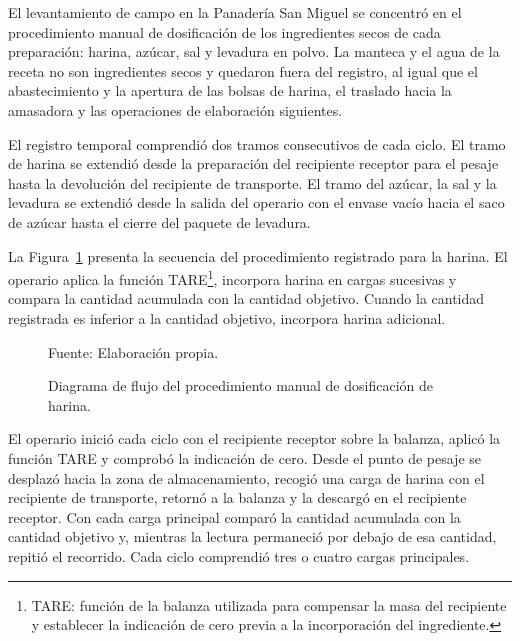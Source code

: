 El levantamiento de campo en la Panadería San Miguel se concentró en el
procedimiento manual de dosificación de los ingredientes secos de cada
preparación: harina, azúcar, sal y levadura en polvo. La manteca y el agua
de la receta no son ingredientes secos y quedaron fuera del registro, al
igual que el
abastecimiento y la apertura de las bolsas de harina, el traslado hacia la
amasadora y las operaciones de elaboración siguientes.

El registro temporal comprendió dos tramos consecutivos de cada ciclo. El
tramo de harina se extendió desde la preparación del recipiente receptor
para el pesaje hasta la devolución del recipiente de transporte. El tramo
del azúcar, la sal y la levadura se extendió desde la salida del operario
con el envase vacío hacia el saco de azúcar hasta el cierre del paquete de
levadura.

La Figura~\ref{fig:dfd_dosificacion} presenta la secuencia del
procedimiento registrado para la harina. El operario aplica la función
TARE\footnote{TARE: función de la balanza utilizada para compensar la masa
del recipiente y establecer la indicación de cero previa a la
incorporación del ingrediente.}, incorpora harina en cargas sucesivas y
compara la cantidad acumulada con la cantidad objetivo. Cuando la cantidad
registrada es inferior a la cantidad objetivo, incorpora harina adicional.

\begin{figure}[H]
    \centering
    \resizebox{0.6\textwidth}{!}{%
        {\setlength{\fboxsep}{14pt}
        \fbox{}}%
    }
    \caption{Diagrama de flujo del procedimiento manual de dosificación de
    harina.}
    \label{fig:dfd_dosificacion}
    \vspace{0.2em}
    {\footnotesize Fuente: Elaboración propia.}
\end{figure}

El operario inició cada ciclo con el recipiente receptor sobre la balanza,
aplicó la función TARE y comprobó la indicación de cero. Desde el punto de
pesaje se desplazó hacia la zona de almacenamiento, recogió una carga de
harina con el recipiente de transporte, retornó a la balanza y la descargó
en el recipiente receptor. Con cada carga principal comparó la cantidad
acumulada con la cantidad objetivo y, mientras la lectura permaneció por
debajo de esa cantidad, repitió el recorrido. Cada ciclo comprendió tres o
cuatro cargas principales.

